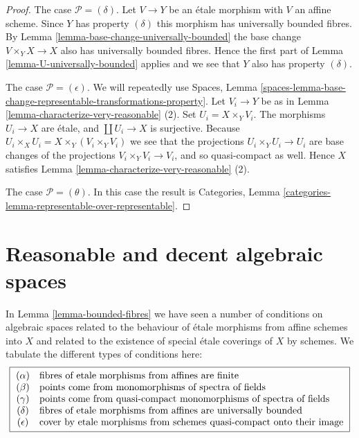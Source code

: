 \begin{proof}
\medskip\noindent
The case $\mathcal{P} = (\delta)$. Let $V \to Y$ be an \'etale morphism with
$V$ an affine scheme. Since $Y$ has property $(\delta)$ this morphism has
universally bounded fibres. By
Lemma \ref{lemma-base-change-universally-bounded}
the base change $V \times_Y X \to X$ also has universally bounded fibres.
Hence the first part of
Lemma \ref{lemma-U-universally-bounded}
applies and we see that $Y$ also has property $(\delta)$.

\medskip\noindent
The case $\mathcal{P} = (\epsilon)$. We will repeatedly use
Spaces, Lemma
\ref{spaces-lemma-base-change-representable-transformations-property}.
Let $V_i \to Y$ be as in
Lemma \ref{lemma-characterize-very-reasonable} (2).
Set $U_i = X \times_Y V_i$. The morphisms $U_i \to X$ are \'etale,
and $\coprod U_i \to X$ is surjective. Because
$U_i \times_X U_i = X \times_Y (V_i \times_Y V_i)$ we see
that the projections $U_i \times_Y U_i \to U_i$ are
base changes of the projections $V_i \times_Y V_i \to V_i$, and so
quasi-compact as well. Hence $X$ satisfies
Lemma \ref{lemma-characterize-very-reasonable} (2).

\medskip\noindent
The case $\mathcal{P} = (\theta)$. In this case the result is
Categories, Lemma \ref{categories-lemma-representable-over-representable}.
\end{proof}











\section{Reasonable and decent algebraic spaces}
\label{section-reasonable-decent}

\noindent
In
Lemma \ref{lemma-bounded-fibres}
we have seen a number of conditions on algebraic spaces related to
the behaviour of \'etale morphisms from affine schemes into $X$
and related to the existence of special \'etale coverings of $X$ by
schemes. We tabulate the different types of conditions here:
$$
\fbox{
$
\begin{matrix}
(\alpha) & \text{fibres of etale morphisms from affines are finite}
\hfill \\
(\beta) & \text{points come from monomorphisms of spectra of fields}
\hfill \\
(\gamma) & \text{points come from quasi-compact monomorphisms of
spectra of fields}
\hfill \\
(\delta) & \text{fibres of etale morphisms from affines are universally
bounded}
\hfill \\
(\epsilon) & \text{cover by etale morphisms from schemes quasi-compact
onto their image} \hfill
\end{matrix}
$
}
$$

